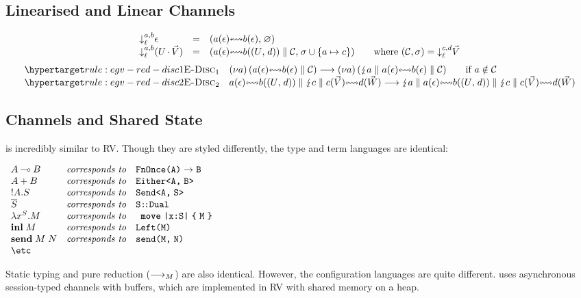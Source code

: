 \documentclass[acmsmall,review,anonymous]{acmart}
\begin{document}
\subsection{Linearised and Linear Channels}
\[
  \begin{array}{lcl}
    \mte[a,b]{\gvVecEmp}
    & = & \gvPair
          {\gvBuf{a}{\gvVecEmp}{b}{\gvVecEmp}}
          {\varnothing}
    \\
    \mte[a,b]{\parens{\tm{U}\gvVecAdd\gvVec{V}}}
    & = & \gvPair
          {\gvPar{\gvBuf{a}{\gvVecEmp}{b}{\gvPair{U}{d}}}{\gvConf{C}}}
          {\sigma\cup\{\tm{a}\mapsto\tm{c}\}}
          \qquad
          \text{where }(\gvConf{C},\sigma)=\mte[c,d]{\gvVec{V}}
  \end{array}
\]
\[
  \begin{array}{ll}
    \rlabel{\textsc{E-Disc$_1$}}{rule:egv-red-disc1}
    &
      \gvRes{a}{\gvPPar{\gvBuf{a}{\gvVecEmp}{b}{\gvVecEmp}}{\gvConf{C}}}
      \gvRedArr
      \gvRes{a}{\gvPPar{\gvZap{a}}{\gvPar{\gvBuf{a}{\gvVecEmp}{b}{\gvVecEmp}}{\gvConf{C}}}}
      \qquad
      \text{if }\tm{a}\notin\gvConf{C}
    \\
    \rlabel{\textsc{E-Disc$_2$}}{rule:egv-red-disc2}
    &
      \gvPar
      {\gvBuf{a}{\gvVecEmp}{b}{\gvPair{U}{d}}}
      {\gvPar{\gvZap{c}}{\gvBuf{c}{\gvVec{V}}{d}{\gvVec{W}}}}
      \gvRedArr
      \gvPar
      {\gvPar{\gvZap{a}}{\gvBuf{a}{\gvVecEmp}{b}{\gvPair{U}{d}}}}
      {\gvPar{\gvZap{c}}{\gvBuf{c}{\gvVec{V}}{d}{\gvVec{W}}}}
  \end{array}
\]

\subsection{Channels and Shared State}
\affineAGV is incredibly similar to RV. Though they are styled differently, the type and term languages are identical:
\begin{center}
  \(
  \begin{array}{lcl}
    \gvTyFun{A}{B}  & \textit{corresponds to} & \rvTyFun{A}{B}
    \\
    \gvTySum{A}{B}  & \textit{corresponds to} & \rvTySum{A}{B}
    \\
    \gvTySend{A}{S} & \textit{corresponds to} & \rvTySend{A}{S}
    \\
    \gvDual{S}      & \textit{corresponds to} & \rvDual{S}
    \\
    \gvAbs[S]{x}{M} & \textit{corresponds to} & \rvAbs[S]{x}{M}
    \\
    \gvInl{M}       & \textit{corresponds to} & \rvInl{M}
    \\
    \gvSend{M}{N}   & \textit{corresponds to} & \rvSend{M}{N}
    \\
    \text{\etc}
  \end{array}
  \)
\end{center}
Static typing and pure reduction ($\mathrel{\relax{\longrightarrow_{M}}}$) are also identical. However, the configuration languages are quite different. \affineAGV uses asynchronous session-typed channels with buffers, which are implemented in RV with shared memory on a heap.
\end{document}
